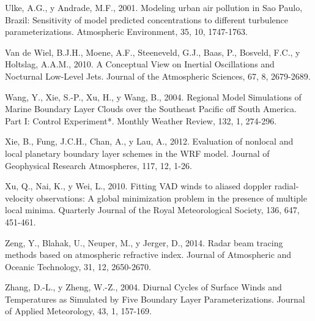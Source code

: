 \documentclass[12pt,spanish,oneside, a4paper]{book}
\begin{document}
\hypertarget{ref-Ulke2001}{}
Ulke, A.G., y Andrade, M.F., 2001. Modeling urban air pollution in Sao
Paulo, Brazil: Sensitivity of model predicted concentrations to
different turbulence parameterizations. Atmospheric Environment, 35, 10,
1747-1763.

\hypertarget{ref-VanDeWiel2010}{}
Van de Wiel, B.J.H., Moene, A.F., Steeneveld, G.J., Baas, P., Bosveld,
F.C., y Holtslag, A.A.M., 2010. A Conceptual View on Inertial
Oscillations and Nocturnal Low-Level Jets. Journal of the Atmospheric
Sciences, 67, 8, 2679-2689.

\hypertarget{ref-Wang2004}{}
Wang, Y., Xie, S.-P., Xu, H., y Wang, B., 2004. Regional Model
Simulations of Marine Boundary Layer Clouds over the Southeast Pacific
off South America. Part I: Control Experiment*. Monthly Weather Review,
132, 1, 274-296.

\hypertarget{ref-Xie2012}{}
Xie, B., Fung, J.C.H., Chan, A., y Lau, A., 2012. Evaluation of nonlocal
and local planetary boundary layer schemes in the WRF model. Journal of
Geophysical Research Atmospheres, 117, 12, 1-26.

\hypertarget{ref-Xu2010}{}
Xu, Q., Nai, K., y Wei, L., 2010. Fitting VAD winds to aliased doppler
radial-velocity observations: A global minimization problem in the
presence of multiple local minima. Quarterly Journal of the Royal
Meteorological Society, 136, 647, 451-461.

\hypertarget{ref-Zeng2014}{}
Zeng, Y., Blahak, U., Neuper, M., y Jerger, D., 2014. Radar beam tracing
methods based on atmospheric refractive index. Journal of Atmospheric
and Oceanic Technology, 31, 12, 2650-2670.

\hypertarget{ref-Zhang2004}{}
Zhang, D.-L., y Zheng, W.-Z., 2004. Diurnal Cycles of Surface Winds and
Temperatures as Simulated by Five Boundary Layer Parameterizations.
Journal of Applied Meteorology, 43, 1, 157-169.
\end{document}

